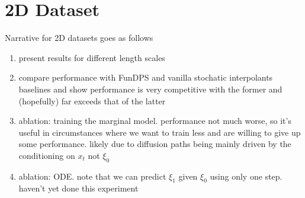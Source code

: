 \section{2D Dataset}\label{sec:darcy2}

Narrative for 2D datasets goes as follows
\begin{enumerate}
  \item present results for different length scales
  \item compare performance with FunDPS and vanilla stochatic interpolants baselines and show performance is very competitive with the former and (hopefully) far exceeds that of the latter
  \item ablation: training the marginal model. performance not much worse, so it's useful in circumstances where we want to train less and are willing to give up some performance. likely due to diffusion paths being mainly driven by the conditioning on \(x_{t}\) not \(\xi_{0}\)
  \item ablation: ODE. note that we can predict \(\xi_{1}\) given \(\xi_{0}\) using only one step. haven't yet done this experiment
\end{enumerate}